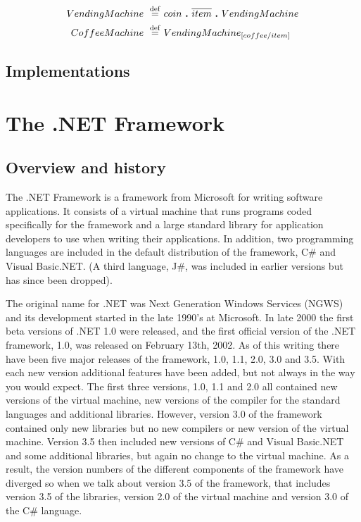 	\begin{Exa}\label{ex:relabelling}
	\begin{align*}
			VendingMachine \ \stackrel{\mathrm{def}}{=}\  & coin \ \textbf{.}\  \overline{item} \ \textbf{.}\  VendingMachine \\
			CoffeeMachine \ \stackrel{\mathrm{def}}{=}\  & VendingMachine_{[coffee/item]}
	\end{align*}	
	\end{Exa}
	

\subsection{Implementations}


	
\section{The .NET Framework}

\subsection{Overview and history}
	The .NET Framework is a framework from Microsoft for writing software 
	applications. It consists of a virtual machine that runs programs coded 
	specifically for the framework and a large standard library for application 
	developers to use when writing their applications. In addition, two 
	programming languages are included in the default distribution of the 
	framework, C\# and Visual Basic.NET. (A third language, J\#, was included in
	earlier versions but has since been dropped).

	The original name for .NET was Next Generation Windows Services (NGWS) and its
	development started in the late 1990's at Microsoft. In late 2000 the first 
	beta versions of .NET 1.0 were released, and the first official version of the
	.NET framework, 1.0, was released on February 13th, 2002. As of this writing 
	there have been five major releases of the framework, 1.0, 1.1, 2.0, 3.0 and 
	3.5. With each new version additional features have been added, but not always 
	in the way you would expect. The first three versions, 1.0, 1.1 and 2.0 all 
	contained new versions of the virtual machine, new versions of the compiler 
	for the standard languages and additional libraries. However, version 3.0 of 
	the framework contained only new libraries but no new compilers or new version 
	of the virtual machine. Version 3.5 then included new versions of C\# and 
	Visual Basic.NET and some additional libraries, but again no change to the 
	virtual machine. As a result, the version numbers of the different components 
	of the framework have diverged so when we talk about version 3.5 of the 
	framework, that includes version 3.5 of the libraries, version 2.0 of the 
	virtual machine and version 3.0 of the C\# language. 

